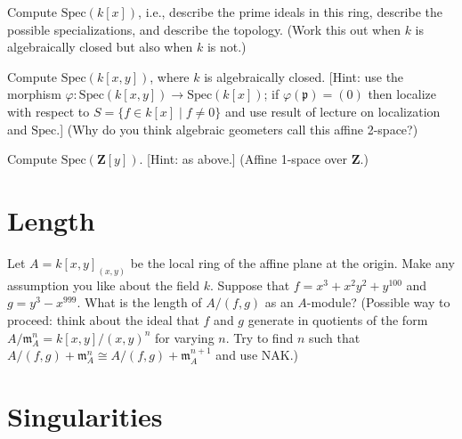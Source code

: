 \begin{exercise}
\label{exercise-primes-kx}
Compute $\text{Spec}(k[x])$, i.e., describe
the prime ideals in this ring, describe the possible specializations, and
describe the topology. (Work this out when $k$ is algebraically closed but
also when $k$ is not.)
\end{exercise}

\begin{exercise}
\label{exercise-primes-kxy}
 Compute $\text{Spec}(k[x, y])$, where $k$ is algebraically
closed.
[Hint: use the morphism
$\varphi: \text{Spec}(k[x, y]) \to \text{Spec}(k[x])$; if
$\varphi({\mathfrak p}) = (0)$ then localize with respect to
$S = \{f\in k[x] \mid f \not = 0\}$ and use result of lecture
on localization and $\text{Spec}$.]
(Why do you think algebraic geometers call this affine 2-space?)
\end{exercise}

\begin{exercise}
\label{exercise-primes-Zy}
Compute $\text{Spec}(\mathbf{Z}[y])$.
[Hint: as above.] (Affine 1-space over $\mathbf{Z}$.)
\end{exercise}
















\section{Length}
\label{section-length}

\begin{exercise}
\label{exercise-compute-length}
Let $A = k[x, y]_{(x, y)}$ be the local ring of the affine plane at
the origin. Make any assumption you like about the field $k$. Suppose
that $f = x^3 + x^2y^2 + y^{100}$ and $g = y^3 - x^{999}$. What is the length
of $A/(f, g)$ as an $A$-module? (Possible way to proceed: think about the
ideal that $f$ and $g$ generate in quotients of the form $A/{\mathfrak m}_A^n=
k[x, y]/(x, y)^n$ for varying $n$. Try to find $n$ such that
$A/(f, g)+{\mathfrak m}_A^n \cong A/(f, g)+{\mathfrak m}_A^{n + 1}$
and use NAK.)
\end{exercise}



\section{Singularities}
\label{section-singularities}

